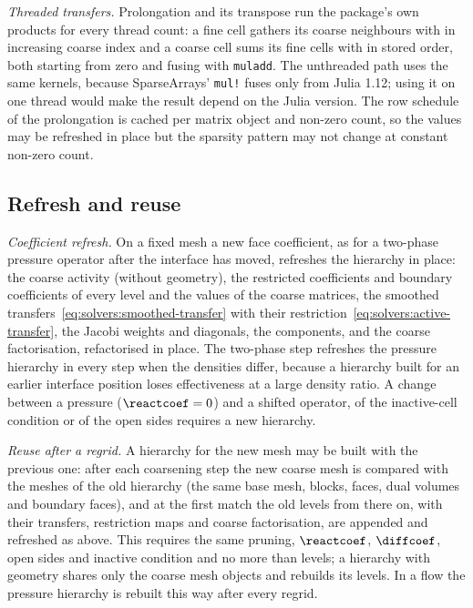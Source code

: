 \emph{Threaded transfers.} Prolongation and its transpose run the package's
own products for every thread count: a fine cell gathers its coarse neighbours
with  in increasing
coarse index and a coarse cell sums its fine cells with
 in stored order, both
starting from zero and fusing with \texttt{muladd}. The unthreaded path uses
the same kernels, because SparseArrays' \texttt{mul!} fuses only from Julia
1.12; using it on one thread would make the result depend on the Julia
version. The row schedule of the prolongation is cached per matrix object and
non-zero count, so the values may be refreshed in place but the sparsity
pattern may not change at constant non-zero count.

\subsection{Refresh and reuse}\label{sec:solvers:reuse}
\emph{Coefficient refresh.} On a fixed mesh a new face coefficient, as for a
two-phase pressure operator after the interface has moved, refreshes the
hierarchy in place: the coarse activity (without geometry), the restricted
coefficients and boundary coefficients of every level and the values of the
coarse matrices, the smoothed transfers~\cref{eq:solvers:smoothed-transfer}
with their restriction~\cref{eq:solvers:active-transfer}, the Jacobi weights
and diagonals, the components, and the coarse factorisation, refactorised in
place. The two-phase step refreshes the pressure hierarchy in every step when
the densities differ, because a hierarchy built for an earlier interface
position loses effectiveness at a large density ratio. A change between a
pressure ($\reactcoef=0$) and a shifted operator, of the inactive-cell
condition or of the open sides requires a new hierarchy.

\emph{Reuse after a regrid.} A hierarchy for the new mesh may be built with the
previous one: after each coarsening step the new coarse mesh is compared with
the meshes of the old hierarchy (the same base mesh, blocks, faces, dual
volumes and boundary faces), and at the first match the old levels from there
on, with their transfers, restriction maps and coarse factorisation, are
appended and refreshed as above. This requires the same pruning, $\reactcoef$,
$\diffcoef$, open sides and inactive condition and no more than
 levels; a hierarchy with geometry shares only the coarse
mesh objects and rebuilds its levels. In a flow the pressure hierarchy is
rebuilt this way after every regrid.

